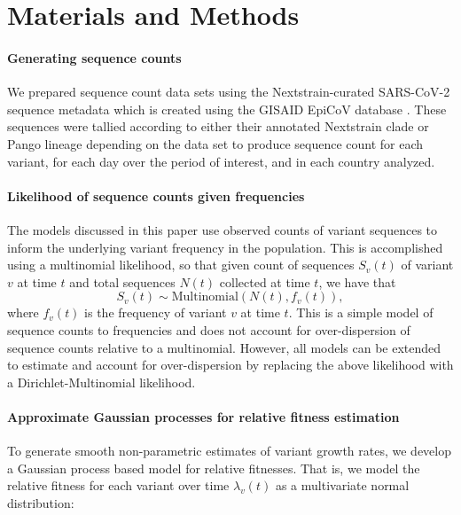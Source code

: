 \documentclass[11pt,oneside,letterpaper]{article}
\begin{document}
\section*{Materials and Methods}

\paragraph{Generating sequence counts}

We prepared sequence count data sets using the Nextstrain-curated SARS-CoV-2 sequence metadata \cite{Hadfield2018} which is created using the GISAID EpiCoV database \cite{khare2021gisaid}.
These sequences were tallied according to either their annotated Nextstrain clade or Pango lineage \cite{aksamentov2021nextclade} depending on the data set to produce sequence count for each variant, for each day over the period of interest, and in each country analyzed.

\paragraph{Likelihood of sequence counts given frequencies}

The models discussed in this paper use observed counts of variant sequences to inform the underlying variant frequency in the population.
This is accomplished using a multinomial likelihood, so that given count of sequences $S_{v}(t)$ of variant $v$ at time $t$ and total sequences $N(t)$ collected at time $t$, we have that
\begin{equation*}
    S_{v}(t) \sim \text{Multinomial}(N(t), f_{v}(t)),
\end{equation*}
where $f_{v}(t)$ is the frequency of variant $v$ at time $t$.
This is a simple model of sequence counts to frequencies and does not account for over-dispersion of sequence counts relative to a multinomial.
However, all models can be extended to estimate and account for over-dispersion by replacing the above likelihood with a Dirichlet-Multinomial likelihood.

\paragraph{Approximate Gaussian processes for relative fitness estimation}

To generate smooth non-parametric estimates of variant growth rates, we develop a Gaussian process based model for relative fitnesses.
That is, we model the relative fitness for each variant over time $\lambda_v(t)$ as a multivariate normal distribution:
\end{document}
